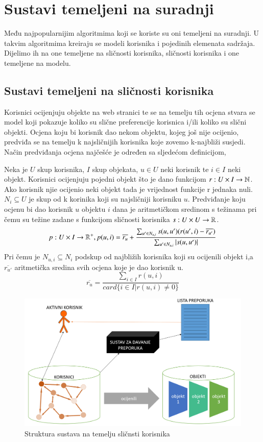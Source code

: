 \documentclass[a4paper,oneside,12pt]{memoir} %
\begin{document}
\chapter{Sustavi temeljeni na suradnji}
%
Među najpopularnijim algoritmima koji se koriste su oni temeljeni na suradnji. U takvim algoritmima kreiraju se modeli korisnika i pojedinih elemenata sadržaja. Dijelimo ih na one temeljene na sličnosti korisnika, sličnosti korisnika i one temeljene na modelu.
%
\section{Sustavi temeljeni na sličnosti korisnika}
%
Korisnici ocijenjuju objekte na web stranici te se na temelju tih ocjena stvara se model koji pokazuje koliko su slične preferencije korisnica i/ili koliko su slični objekti. Ocjena koju bi korisnik dao nekom objektu, kojeg još nije ocijenio, predviđa se na temelju k najsličnijih korisnika koje zovemo k-najbliži susjedi. Način predviđanja ocjena najčešće je određen sa sljedećom definicijom,
\begin{defn}
Neka je $U$ skup korisnika, $I$ skup objekata, $u\in U$ neki korisnik te $i\in I$ neki objekt. Korisnici ocijenjuju pojedni objekt što je dano funkcijom $r:U\times I \rightarrow \mathbb{N}$. Ako korisnik njie ocijenio neki objekt tada je vrijednost funkcije r jednaka nuli. $N_i \subseteq U$ je skup od k korinika koji su najsličniji korisniku $u$. Predviđanje koju ocjenu bi dao korisnik $u$ objektu $i$ dana je aritmetičkom sredinom s težinama pri čemu su težine zadane s funkcijom sličnosti korisnika $s:U\times U\rightarrow \mathbb{R}$. 
\[ p:U\times I \rightarrow \mathbb{R}^+, p(u,i) = \overline{r_{u}}+\frac{\sum_{u'\in N_{u,i}}s(u,u')(r(u',i)-\overline{r_{u'}})}{\sum_{u'\in N_{u,i}}|s(u,u')|} \]
Pri čemu je $N_{u,i} \subseteq N_i$ podskup od najbližih korisnika koji su ocijenili objekt i,a $\overline{r_{u'}}$ aritmetička sredina svih ocjena koje je dao korisnik u.
\[ \overline{r_{u}}=\frac{\sum_{i\in I}r(u,i)}{card\{i\in I | r(u,i) \neq 0 \} } \]
\end{defn}
\begin{figure}
\begin{center}
\includegraphics[scale=0.4]{slike/user-based.png}
\caption{Struktura sustava na temelju sličnsti korisnika}
\end{center}
\end{figure}
\end{document}
